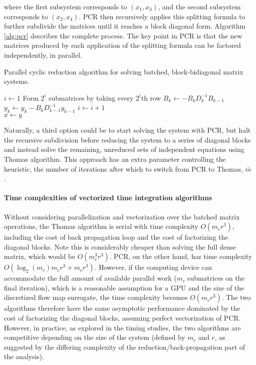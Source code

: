 where the first subsystem corresponds to $(x_1, x_3)$, and the second subsystem corresponds to $(x_2, x_4)$. PCR then recursively applies this splitting formula to further subdivide the matrices until it reaches a block diagonal form.  Algorithm \ref{alg:pcr} describes the complete process.  The key point in PCR is that the new matrices produced by each application of the splitting formula can be factored independently, in parallel.

\begin{algorithm}
\caption{Parallel cyclic reduction algorithm for solving batched, block-bidiagonal matrix systems.}\label{alg:pcr}
\begin{algorithmic}
\State $i \gets 1$
\State Form $2^i$ submatrices by taking every $2^i$th row
 
\State $B_k \gets -B_k D_k^{-1}B_{k-1}$
\State $y_k \gets y_k - B_k D_{k-1}^{-1} y_{k-1}$
\EndFor
\EndFor
\State $i \gets i + 1$
\EndWhile \\
\Return $x \gets y$
\end{algorithmic}
\end{algorithm}

\begin{remark}
Naturally, a third option could be to start solving the system with PCR, but halt the recursive subdivision before reducing the system to a series of diagonal blocks and instead solve the remaining, unreduced sets of independent equations using Thomas algorithm.  This approach has an extra parameter controlling the heuristic, the number of iterations after which to switch from PCR to Thomas, $\bar{m}$.
\end{remark}

\paragraph{Time complexities of vectorized time integration algorithms}
Without considering parallelization and vectorization over the batched matrix operations, the Thomas algorithm is serial with time complexity $O(m_c r^3)$, including the cost of back propagation loop and the cost of factorizing the diagonal blocks. Note this is considerably cheaper than solving the full dense matrix, which would be $O(m_c^3 r^3)$. PCR, on the other hand, has time complexity $O(\log_2(m_c) m_c r^3 + m_c r^3)$. However, if the computing device can accommodate the full amount of available parallel work ($m_c$ submatrices on the final iteration), which is a reasonable assumption for a GPU and the size of the discretized flow map surrogate, the time complexity becomes $O(m_c r^3)$. The two algorithms therefore have the same asymptotic performance dominated by the cost of factorizing the diagonal blocks, assuming perfect vectorization of PCR.  However, in practice, as explored in the timing studies, the two algorithms are competitive depending on the size of the system (defined by $m_c$ and $r$, as suggested by the differing complexity of the reduction/back-propagation part of the analysis).

